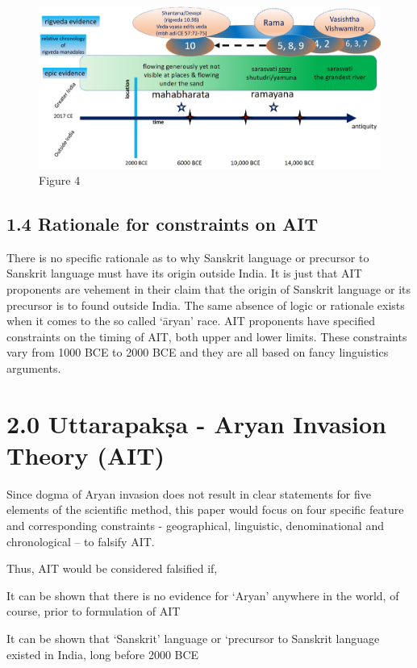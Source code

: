 \begin{figure}
\includegraphics{"images/8-04.jpg"}
\caption{Figure 4}
\end{figure}


\subsection{1.4 Rationale for constraints on AIT}

There is no specific rationale as to why Sanskrit language or precursor to Sanskrit language must have its origin outside India. It is just that AIT proponents are vehement in their claim that the origin of Sanskrit language or its precursor is to found outside India. The same absence of logic or rationale exists when it comes to the so called ‘āryan’ race. AIT proponents have specified constraints on the timing of AIT, both upper and lower limits. These constraints vary from 1000 BCE to 2000 BCE and they are all based on fancy linguistics arguments.


\section*{2.0 Uttarapakṣa - Aryan Invasion Theory (AIT)}

Since dogma of Aryan invasion does not result in clear statements for five elements of the scientific method, this paper would focus on four specific feature and corresponding constraints - geographical, linguistic, denominational and chronological – to falsify AIT.

Thus, AIT would be considered falsified if,

\item It can be shown that there is no evidence for ‘Aryan’ anywhere in the world, of course, prior to formulation of AIT

 \item It can be shown that ‘Sanskrit’ language or ‘precursor to Sanskrit language existed in India, long before 2000 BCE

